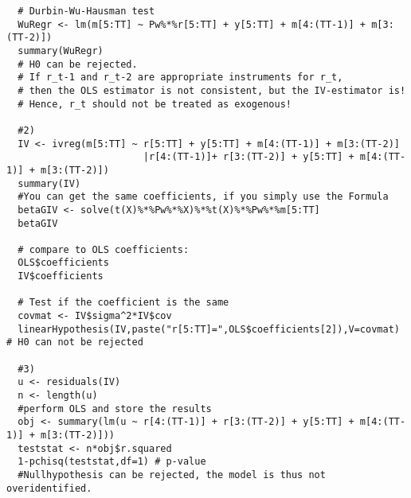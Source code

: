 \begin{Solution}{13.5}
\begin{verbatim}
  # Durbin-Wu-Hausman test
  WuRegr <- lm(m[5:TT] ~ Pw%*%r[5:TT] + y[5:TT] + m[4:(TT-1)] + m[3:(TT-2)])
  summary(WuRegr)
  # H0 can be rejected.
  # If r_t-1 and r_t-2 are appropriate instruments for r_t,
  # then the OLS estimator is not consistent, but the IV-estimator is!
  # Hence, r_t should not be treated as exogenous!

  #2)
  IV <- ivreg(m[5:TT] ~ r[5:TT] + y[5:TT] + m[4:(TT-1)] + m[3:(TT-2)]
                        |r[4:(TT-1)]+ r[3:(TT-2)] + y[5:TT] + m[4:(TT-1)] + m[3:(TT-2)])
  summary(IV)
  #You can get the same coefficients, if you simply use the Formula
  betaGIV <- solve(t(X)%*%Pw%*%X)%*%t(X)%*%Pw%*%m[5:TT]
  betaGIV

  # compare to OLS coefficients:
  OLS$coefficients
  IV$coefficients

  # Test if the coefficient is the same
  covmat <- IV$sigma^2*IV$cov
  linearHypothesis(IV,paste("r[5:TT]=",OLS$coefficients[2]),V=covmat) # H0 can not be rejected

  #3)
  u <- residuals(IV)
  n <- length(u)
  #perform OLS and store the results
  obj <- summary(lm(u ~ r[4:(TT-1)] + r[3:(TT-2)] + y[5:TT] + m[4:(TT-1)] + m[3:(TT-2)]))
  teststat <- n*obj$r.squared
  1-pchisq(teststat,df=1) # p-value
  #Nullhypothesis can be rejected, the model is thus not overidentified.
\end{verbatim}
\end{Solution}
